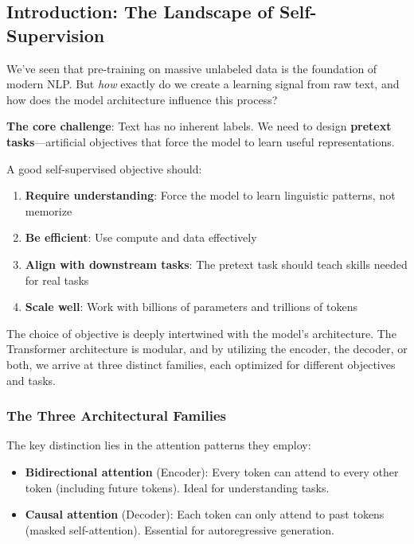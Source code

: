 \documentclass{article}
\begin{document}
\subsection{Introduction: The Landscape of Self-Supervision}

We've seen that pre-training on massive unlabeled data is the foundation of modern NLP. But \textit{how} exactly do we create a learning signal from raw text, and how does the model architecture influence this process?

\textbf{The core challenge}: Text has no inherent labels. We need to design \textbf{pretext tasks}---artificial objectives that force the model to learn useful representations.

\begin{tcolorbox}[colback=blue!5!white, colframe=blue!75!black, title=What Makes a Good SSL Objective?]
A good self-supervised objective should:

\begin{enumerate}
\item \textbf{Require understanding}: Force the model to learn linguistic patterns, not memorize
\item \textbf{Be efficient}: Use compute and data effectively
\item \textbf{Align with downstream tasks}: The pretext task should teach skills needed for real tasks
\item \textbf{Scale well}: Work with billions of parameters and trillions of tokens
\end{enumerate}
\end{tcolorbox}

The choice of objective is deeply intertwined with the model's architecture. The Transformer architecture is modular, and by utilizing the encoder, the decoder, or both, we arrive at three distinct families, each optimized for different objectives and tasks.

\subsubsection{The Three Architectural Families}

The key distinction lies in the attention patterns they employ:

\begin{itemize}
\item \textbf{Bidirectional attention} (Encoder): Every token can attend to every other token (including future tokens). Ideal for understanding tasks.
\item \textbf{Causal attention} (Decoder): Each token can only attend to past tokens (masked self-attention). Essential for autoregressive generation.
\end{itemize}
\end{document}
